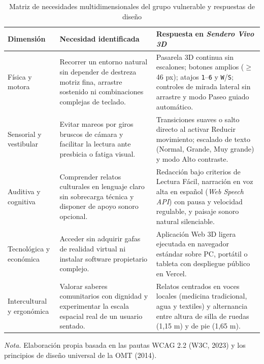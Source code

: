 \documentclass[12pt,letterpaper]{article}
\begin{document}
\begin{table}[H]
\centering
\caption{Matriz de necesidades multidimensionales del grupo vulnerable y respuestas de diseño}
\label{tab:necesidades}
\fontsize{9.5}{12}\selectfont
\begin{tabularx}{\textwidth}{L{2.5cm} L{5.0cm} >{\raggedright\arraybackslash}X}
\toprule
\textbf{Dimensión} & \textbf{Necesidad identificada} & \textbf{Respuesta en \textit{Sendero Vivo 3D}} \\
\midrule
Física y motora &
Recorrer un entorno natural sin depender de destreza motriz fina, arrastre sostenido ni combinaciones complejas de teclado. &
Pasarela 3D continua sin escalones; botones amplios ($\geq$ 46 px); atajos \texttt{1}--\texttt{6} y \texttt{W}/\texttt{S}; controles de mirada lateral sin arrastre y modo Paseo guiado automático. \\
\addlinespace[4pt]
Sensorial y vestibular &
Evitar mareos por giros bruscos de cámara y facilitar la lectura ante presbicia o fatiga visual. &
Transiciones suaves o salto directo al activar Reducir movimiento; escalado de texto (Normal, Grande, Muy grande) y modo Alto contraste. \\
\addlinespace[4pt]
Auditiva y cognitiva &
Comprender relatos culturales en lenguaje claro sin sobrecarga técnica y disponer de apoyo sonoro opcional. &
Redacción bajo criterios de Lectura Fácil, narración en voz alta en español (\textit{Web Speech API}) con pausa y velocidad regulable, y paisaje sonoro natural silenciable. \\
\addlinespace[4pt]
Tecnológica y económica &
Acceder sin adquirir gafas de realidad virtual ni instalar software propietario complejo. &
Aplicación Web 3D ligera ejecutada en navegador estándar sobre PC, portátil o tableta con despliegue público en Vercel. \\
\addlinespace[4pt]
Intercultural y ergonómica &
Valorar saberes comunitarios con dignidad y experimentar la escala espacial real de un usuario sentado. &
Relatos centrados en voces locales (medicina tradicional, agua y textiles) y alternancia entre altura de silla de ruedas (1,15 m) y de pie (1,65 m). \\
\bottomrule
\end{tabularx}
\vspace{4pt}
\par\raggedright\fontsize{9}{11}\selectfont\textit{Nota.} Elaboración propia basada en las pautas WCAG 2.2 (W3C, 2023) y los principios de diseño universal de la OMT (2014).
\end{table}
\end{document}
